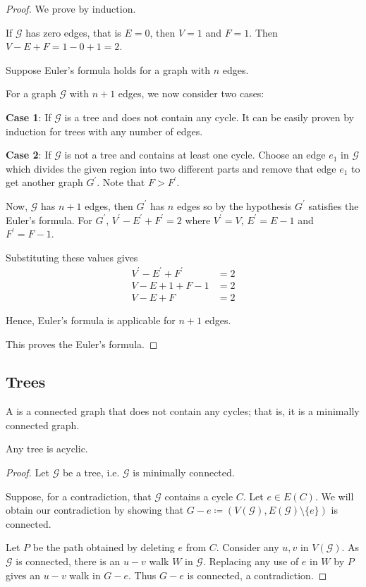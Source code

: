 \begin{proof}
We prove by induction.

If $\mathcal{G}$ has zero edges, that is $E=0$, then $V=1$ and $F=1$. Then $V-E+F=1-0+1=2$.

Suppose Euler's formula holds for a graph with $n$ edges.

For a graph $\mathcal{G}$ with $n+1$ edges, we now consider two cases:

\textbf{Case 1}: If $\mathcal{G}$ is a tree and does not contain any cycle. It can be easily proven by induction for trees with any number of edges.

\textbf{Case 2}: If $\mathcal{G}$ is not a tree and contains at least one cycle. Choose an edge $e_1$ in $\mathcal{G}$ which divides the given region into two different parts and remove that edge $e_1$ to get another graph $G^\prime$. Note that $F>F^\prime$.

Now, $\mathcal{G}$ has $n+1$ edges, then $G^\prime$ has $n$ edges so by the hypothesis $G^\prime$ satisfies the Euler's formula. For $G^\prime$, $V^\prime-E^\prime+F^\prime=2$ where $V^\prime=V$, $E^\prime=E-1$ and $F^\prime=F-1$.

Substituting these values gives
\begin{align*}
V^\prime-E^\prime+F^\prime&=2\\
V-E+1+F-1&=2\\
V-E+F&=2
\end{align*}

Hence, Euler's formula is applicable for $n+1$ edges.

This proves the Euler's formula.
\end{proof}

\subsection{Trees}
\begin{definition}[Tree]
A  is a connected graph that does not contain any cycles; that is, it is a minimally connected graph.
\end{definition}

\begin{proposition}\label{prop:tree-acyclic}
Any tree is acyclic.
\end{proposition}

\begin{proof}
Let $\mathcal{G}$ be a tree, i.e. $\mathcal{G}$ is minimally connected.

Suppose, for a contradiction, that $\mathcal{G}$ contains a cycle $C$. Let $e \in E(C)$. We will obtain our contradiction by showing that $G-e \coloneqq (V(\mathcal{G}),E(\mathcal{G})\setminus\{e\})$ is connected. 

Let $P$ be the path obtained by deleting $e$ from $C$. Consider any $u,v$ in $V(\mathcal{G})$. As $\mathcal{G}$ is connected, there is an $u-v$ walk $W$ in $\mathcal{G}$. Replacing any use of $e$ in $W$ by $P$ gives an $u-v$ walk in $G-e$. Thus $G-e$ is connected, a contradiction.
\end{proof}

